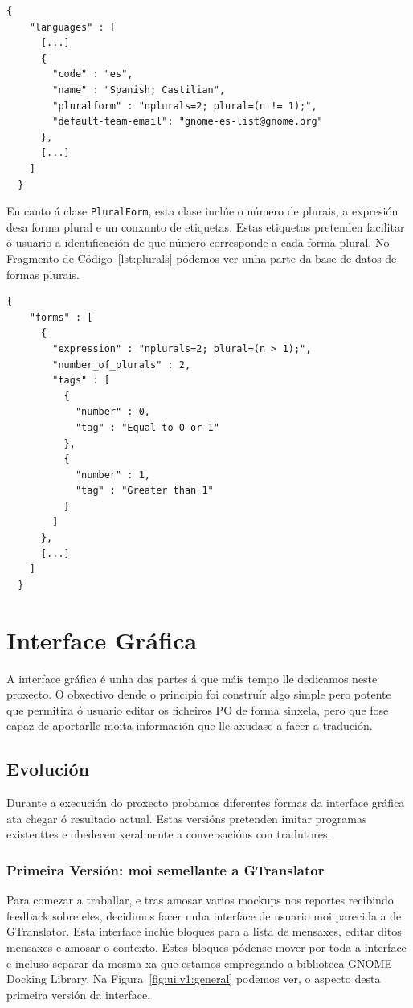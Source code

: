 \begin{lstlisting}[label=lst:languages,caption=Fragmento da Base de Datos de Linguaxes]
  {
    "languages" : [
      [...]
      {
        "code" : "es",
        "name" : "Spanish; Castilian",
        "pluralform" : "nplurals=2; plural=(n != 1);",
        "default-team-email": "gnome-es-list@gnome.org"
      },
      [...]
    ]
  }
\end{lstlisting}

En canto á clase \lstinline{PluralForm}, esta clase inclúe o número de plurais, a expresión desa forma plural e un conxunto de etiquetas. Estas etiquetas pretenden facilitar ó usuario a identificación de que número corresponde a cada forma plural. No Fragmento de Código~\ref{lst:plurals} pódemos ver unha parte da base de datos de formas plurais.

\begin{lstlisting}[label=lst:plurals,caption=Fragmento da Base de Datos de Plurais]
  {
    "forms" : [
      {
        "expression" : "nplurals=2; plural=(n > 1);",
        "number_of_plurals" : 2,
        "tags" : [
          {
            "number" : 0,
            "tag" : "Equal to 0 or 1"
          },
          {
            "number" : 1,
            "tag" : "Greater than 1"
          }
        ]
      },
      [...]
    ]
  }
\end{lstlisting}

\section{Interface Gráfica}
A interface gráfica é unha das partes á que máis tempo lle dedicamos neste proxecto. O obxectivo dende o principio foi construír algo simple pero potente que permitira ó usuario editar os ficheiros PO de forma sinxela, pero que fose capaz de aportarlle moita información que lle axudase a facer a tradución.

\subsection{Evolución}
Durante a execución do proxecto probamos diferentes formas da interface gráfica ata chegar ó resultado actual. Estas versións pretenden imitar programas existenttes e obedecen xeralmente a conversacións con tradutores.

\subsubsection{Primeira Versión: moi semellante a GTranslator}
Para comezar a traballar, e tras amosar varios mockups nos reportes recibindo feedback sobre eles, decidimos facer unha interface de usuario moi parecida a de GTranslator. Esta interface inclúe bloques para a lista de mensaxes, editar ditos mensaxes e amosar o contexto. Estes bloques pódense mover por toda a interface e incluso separar da mesma xa que estamos empregando a biblioteca GNOME Docking Library. Na Figura~\ref{fig:ui:v1:general} podemos ver, o aspecto desta primeira versión da interface.

